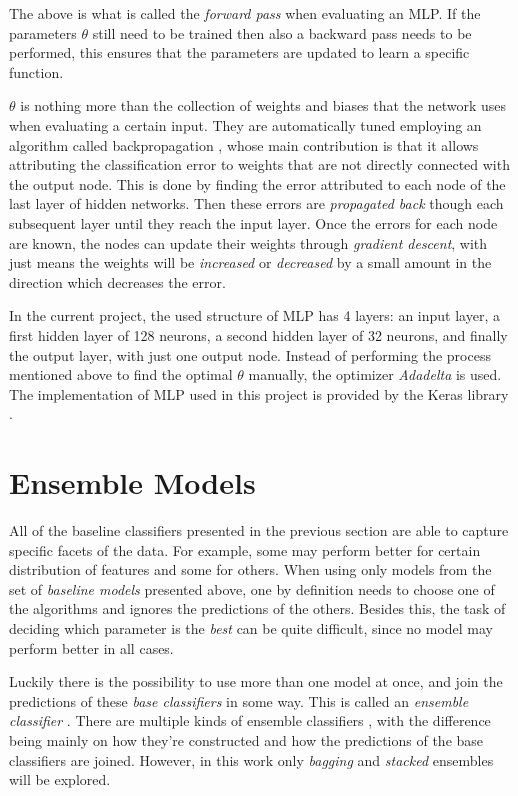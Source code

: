 \documentclass[epsfig,a4paper,11pt,titlepage,twoside,openany]{book}
\begin{document}
The above is what is called the \textit{forward pass} when evaluating an MLP. If the parameters $\theta$ still need to be trained then also a backward pass needs to be performed, this ensures that the parameters are updated to learn a specific function.

$\theta$ is nothing more than the collection of weights and biases that the network uses when evaluating a certain input. They are automatically tuned employing an algorithm called backpropagation \cite{Rumelhart1986}, whose main contribution is that it allows attributing the classification error to weights that are not directly connected with the output node. This is done by finding the error attributed to each node of the last layer of hidden networks. Then these errors are \textit{propagated back} though each subsequent layer until they reach the input layer. Once the errors for each node are known, the nodes can update their weights through \textit{gradient descent}, with just means the weights will be \textit{increased} or \textit{decreased} by a small amount in the direction which decreases the error.

In the current project, the used structure of MLP has 4 layers: an input layer, a first hidden layer of 128 neurons, a second hidden layer of 32 neurons, and finally the output layer, with just one output node. Instead of performing the process mentioned above to find the optimal $\theta$ manually, the optimizer \textit{Adadelta} \cite{zeiler2012adadelta} is used. The implementation of MLP used in this project is provided by the Keras library \cite{chollet2015keras}.


\section{Ensemble Models}
\label{sec:ensemble-models}

All of the baseline classifiers presented in the previous section are able to capture specific facets of the data. For example, some may perform better for certain distribution of features and some for others. When using only models from the set of \textit{baseline models} presented above, one by definition needs to choose one of the algorithms and ignores the predictions of the others. Besides this, the task of deciding which parameter is the \textit{best} can be quite difficult, since no model may perform better in all cases. 

Luckily there is the possibility to use more than one model at once, and join the predictions of these \textit{base classifiers} in some way. This is called an \textit{ensemble classifier} \cite{zhou2012ensemble}. There are multiple kinds of ensemble classifiers \cite{opitz1999popular,dietterich2000ensemble}, with the difference being mainly on how they're constructed and how the predictions of the base classifiers are joined. However, in this work only \textit{bagging} and \textit{stacked} ensembles will be explored.
\end{document}
